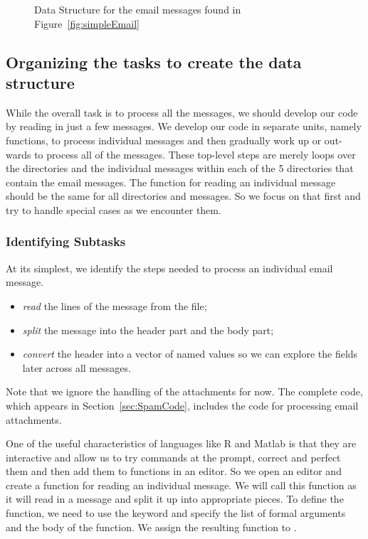 \begin{figure}

\vspace{3in}

\caption{Data Structure for the email messages found in Figure~\ref{fig:simpleEmail}}\label{fig:spamStructure}
\end{figure}

\subsection{Organizing the tasks to create the data structure}

While the overall task is to process all the messages, 
we should develop our code by reading in just a few messages.  
We develop our code in separate
units, namely functions, to process individual messages and then
gradually work up or out-wards to process all of the messages.  These
top-level steps are merely loops over the directories and the
individual messages within each of the 5 directories that contain the
email messages.  The function
for reading an individual message should be the same for all
directories and messages. So we focus on that first and 
try to handle special cases as we encounter them.

\subsubsection{Identifying Subtasks}
At its simplest, we identify the steps needed to process an individual
email message.

\begin{itemize}
\item 
 \textit{read} the lines of the message from the file;

\item
 \textit{split} the message into the header part and the body part;

\item
 \textit{convert} the header into a vector of named values so 
 we can explore the fields later across all messages.
\end{itemize}
Note that we ignore the handling of the attachments for now.
The complete code, which appears in Section~\ref{sec:SpamCode},
includes the code for processing email attachments.

One of the useful characteristics of languages like R and Matlab is
that they are interactive and allow us to try commands at the prompt,
correct and perfect them and then add them to functions in an editor.
So we open an editor and create a function for reading an individual 
message.  
We will call this function  as it
will read in a message and split it up into appropriate pieces.  
To define the function,
we need to use the  keyword and specify
the list of formal arguments and the body of the function.  We assign
the resulting function to .

